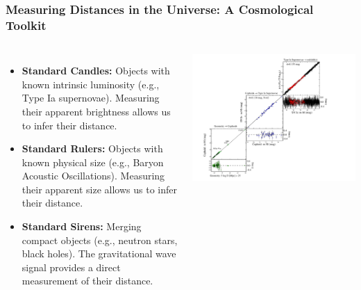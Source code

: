 \documentclass[aspectratio=169]{beamer}
\begin{document}
\begin{frame}
    \frametitle{Measuring Distances in the Universe: A Cosmological Toolkit}
    \begin{columns}
        \begin{itemize}
            \item \textbf{Standard Candles:} Objects with known intrinsic luminosity (e.g., Type Ia supernovae).  Measuring their apparent brightness allows us to infer their distance. 
            \item \textbf{Standard Rulers:} Objects with known physical size (e.g., Baryon Acoustic Oscillations). Measuring their apparent size allows us to infer their distance. 
            \item \textbf{Standard Sirens:} Merging compact objects (e.g., neutron stars, black holes). The gravitational wave signal provides a direct measurement of their distance. 
        \end{itemize}
        \includegraphics[width=\textwidth]{figures/Dist_Ladd_distance_ladder_R22.pdf}
    \end{columns}
\end{frame}
\end{document}
